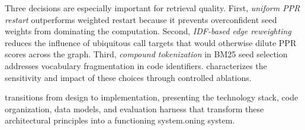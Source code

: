 Three decisions are especially important for retrieval quality. First, \emph{uniform PPR restart} outperforms weighted restart because it prevents overconfident seed weights from dominating the computation. Second, \emph{IDF-based edge reweighting} reduces the influence of ubiquitous call targets that would otherwise dilute PPR scores across the graph. Third, \emph{compound tokenization} in BM25 seed selection addresses vocabulary fragmentation in code identifiers.  characterizes the sensitivity and impact of these choices through controlled ablations.

 transitions from design to implementation, presenting the technology stack, code organization, data models, and evaluation harness that transform these architectural principles into a functioning system.oning system.